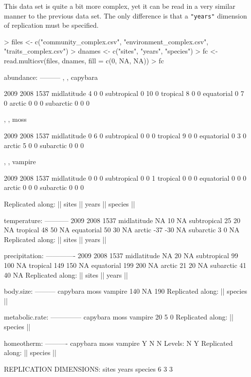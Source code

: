 \documentclass{article}
\newcommand{\code}[1]{\texttt{#1}}
\numberwithin{exercise}{section}
\begin{document}
This data set is quite a bit more complex, yet it can be read in a very similar manner to the previous data set.  The only difference is that a \code{"years"} dimension of replication must be specified.

\begin{Schunk}
\begin{Sinput}
> files <- c("community_complex.csv", "environment_complex.csv", "traits_complex.csv")
> dnames <- c("sites", "years", "species")
> fc <- read.multicsv(files, dnames, fill = c(0, NA, NA))
> fc
\end{Sinput}
\begin{Soutput}
abundance:
---------
, , capybara

            2009 2008 1537
midlatitude    4    0    0
subtropical    0   10    0
tropical       8    0    0
equatorial     0    7    0
arctic         0    0    0
subarctic      0    0    0

, , moss

            2009 2008 1537
midlatitude    0    6    0
subtropical    0    0    0
tropical       9    0    0
equatorial     0    3    0
arctic         5    0    0
subarctic      0    0    0

, , vampire

            2009 2008 1537
midlatitude    0    0    0
subtropical    0    0    1
tropical       0    0    0
equatorial     0    0    0
arctic         0    0    0
subarctic      0    0    0

Replicated along:  || sites || years || species || 


temperature:
-----------
            2009 2008 1537
midlatitude   NA   10   NA
subtropical   25   20   NA
tropical      48   50   NA
equatorial    50   30   NA
arctic       -37  -30   NA
subarctic      3    0   NA
Replicated along:  || sites || years || 


precipitation:
-------------
            2009 2008 1537
midlatitude   NA   20   NA
subtropical   99  100   NA
tropical     149  150   NA
equatorial   199  200   NA
arctic        21   20   NA
subarctic     41   40   NA
Replicated along:  || sites || years || 


body.size:
---------
capybara     moss  vampire 
     140       NA      190 
Replicated along:  || species || 


metabolic.rate:
--------------
capybara     moss  vampire 
      20        5        0 
Replicated along:  || species || 


homeotherm:
----------
capybara     moss  vampire 
       Y        N        N 
Levels: N Y
Replicated along:  || species || 


REPLICATION DIMENSIONS: 
  sites   years species 
      6       3       3 
\end{Soutput}
\end{Schunk}
\end{document}
